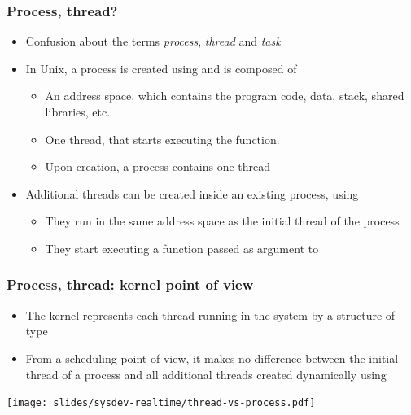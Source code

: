 \begin{frame}
  \frametitle{Process, thread?}
  \begin{itemize}
  \item Confusion about the terms {\em process}, {\em thread} and {\em task}
  \item In Unix, a process is created using  and is composed of
    \begin{itemize}
    \item An address space, which contains the program code, data, stack, shared
      libraries, etc.
    \item One thread, that starts executing the  function.
    \item Upon creation, a process contains one thread
    \end{itemize}
  \item Additional threads can be created inside an existing process, using
    \begin{itemize}
    \item They run in the same address space as the initial thread of
      the process
    \item They start executing a function passed as argument to
    \end{itemize}
  \end{itemize}
\end{frame}

\begin{frame}
  \frametitle{Process, thread: kernel point of view}
  \begin{itemize}
  \item The kernel represents each thread running in the system by a structure of
    type 
  \item From a scheduling point of view, it makes no difference
    between the initial thread of a process and all additional threads
    created dynamically using 
  \end{itemize}
  \begin{center}
    \texttt{[image: slides/sysdev-realtime/thread-vs-process.pdf]}
  \end{center}
\end{frame}

